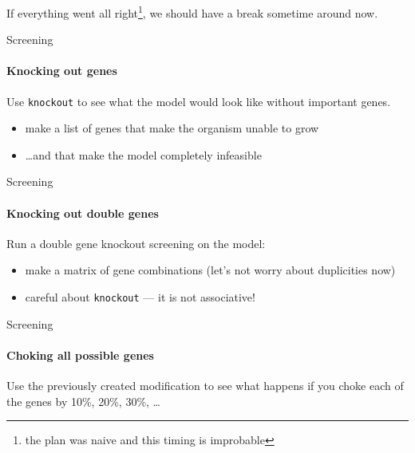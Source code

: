 \documentclass[aspectratio=169]{beamer}
\begin{document}
\begin{frame}[standout]
If everything went all right\footnote{the plan was naive and this timing is improbable}, we should have a break sometime around now.
\end{frame}

\begin{frame}[fragile]{Screening}
\framesubtitle{Knocking out genes}
Use \verb|knockout| to see what the model would look like without important genes.

\bigskip
\begin{itemize}
\item make a list of genes that make the organism unable to grow
\item \dots and that make the model completely infeasible
\end{itemize}
\end{frame}

\begin{frame}[fragile]{Screening}
\framesubtitle{Knocking out double genes}
Run a double gene knockout screening on the model:
\begin{itemize}
\item make a matrix of gene combinations (let's not worry about duplicities now)
\item careful about \verb|knockout| --- it is not associative!
\end{itemize}
\end{frame}

\begin{frame}[fragile]{Screening}
\framesubtitle{Choking all possible genes}
Use the previously created modification to see what happens if you choke each of the genes by 10\%, 20\%, 30\%, \dots
\end{frame}
\end{document}
